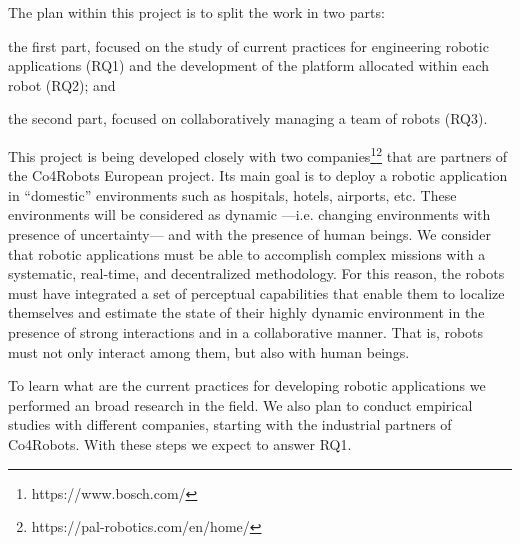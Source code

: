 The plan within this project is to split the work in two parts:
\begin{enumerate*}
\item the first part, focused on the study of current practices for engineering robotic applications (RQ1) and the development of the platform allocated within each robot (RQ2); and
\item the second part, focused on collaboratively managing a team of robots (RQ3).
\end{enumerate*}

This project is being developed closely with two companies\footnote{https://www.bosch.com/}\footnote{https://pal-robotics.com/en/home/} that are partners of the Co4Robots European project.
Its main goal is to deploy a robotic application in ``domestic'' environments such as hospitals, hotels, airports, etc.
These environments will be considered as dynamic ---i.e. changing environments with presence of uncertainty--- and with the presence of human beings.
We consider that robotic applications must be able to accomplish complex missions with a systematic, real-time, and decentralized methodology.
For this reason, the robots must have integrated a set of perceptual capabilities that enable them to localize themselves and estimate the state of their highly dynamic environment in the presence of strong interactions and in a collaborative manner.
That is, robots must not only interact among them, but also with human beings.

To learn what are the current practices for developing robotic applications we performed an broad research in the field.
We also plan to conduct empirical studies with different companies, starting with the industrial partners of Co4Robots.
With these steps we expect to answer RQ1. %




